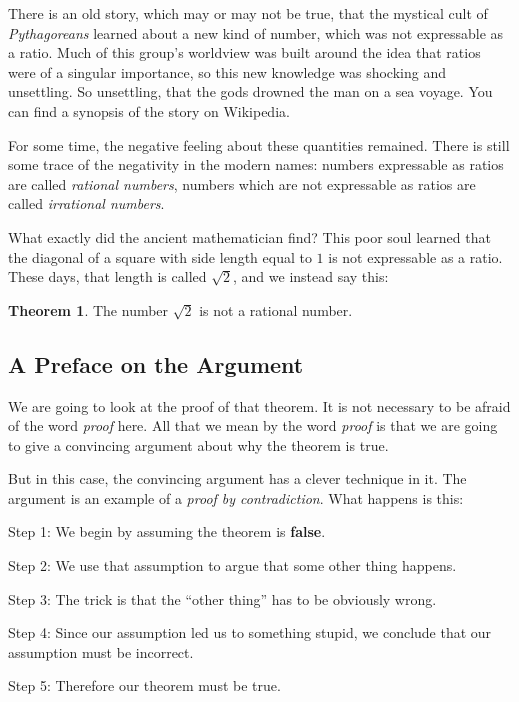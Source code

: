 \documentclass[12pt,letterpaper]{article}
\theoremstyle{definition}
\newtheorem*{theorem}{Theorem}
\begin{document}
There is an old story, which may or may not be true, that the mystical cult of \emph{Pythagoreans} learned about a new kind of number, which was not expressable as a ratio. 
Much of this group's worldview was built around the idea that ratios were of a singular importance, so this new knowledge was shocking and unsettling.
So unsettling, that the gods drowned the man on a sea voyage. 
You can find a synopsis of the story on Wikipedia\cite{wikipedia}.

For some time, the negative feeling about these quantities remained.
There is still some trace of the negativity in the modern names:
numbers expressable as ratios are called \emph{rational numbers}, numbers which are not expressable as ratios are called \emph{irrational numbers}.

What exactly did the ancient mathematician find?
This poor soul learned that the diagonal of a square with side length equal to $1$ is not expressable as a ratio.
These days, that length is called $\sqrt{2}$, and we instead say this:

\begin{theorem}
The number $\sqrt{2}$ is not a rational number.
\end{theorem}

\subsection*{A Preface on the Argument}

We are going to look at the proof of that theorem.
It is not necessary to be afraid of the word \emph{proof} here.
All that we mean by the word \emph{proof} is that we are going to give a convincing argument about why the theorem is true.

But in this case, the convincing argument has a clever technique in it.
The argument is an example of a \emph{proof by contradiction}. 
What happens is this:
\begin{compactdesc}
\item[Step 1:] We begin by assuming the theorem is \textbf{false}.
\item[Step 2:] We use that assumption to argue that some other thing happens.
\item[Step 3:] The trick is that the ``other thing'' has to be obviously wrong.
\item[Step 4:] Since our assumption led us to something stupid, we conclude that our assumption must be incorrect.
\item[Step 5:] Therefore our theorem must be true.
\end{compactdesc}
\end{document}
